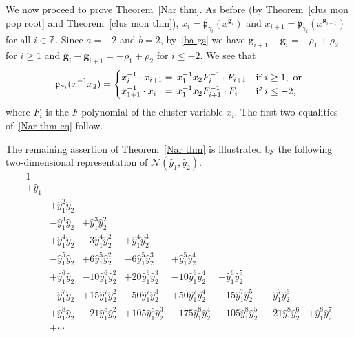 \documentclass[ALCO,ThmDefs,Unicode,epreuves]{cedram}
\newcommand{\integers}{\mathbb Z}
\newcommand{\N}{{\mathcal N}}
\newcommand{\p}{{\mathfrak p}}
\newcommand{\g}{\mathbf{g}}
\newcommand{\hy}{\hat{y}}
\begin{document}
We now proceed to prove Theorem~\ref{Nar thm}.
As before (by Theorem~\ref{clus mon pop root} and Theorem~\ref{clus mon thm}), $x_i=\p_{\gamma_i}(x^{\g_i})$ and $x_{i+1}=\p_{\gamma_i}(x^{\g_{i+1}})$ for all $i\in\integers$.
Since $a=-2$ and $b=2$, by~\eqref{ba gs} we have $\g_{i+1}-\g_i=-\rho_1+\rho_2$ for $i\ge1$ and $\g_i-\g_{i+1}=-\rho_1+\rho_2$ for $i\le-2$.
We see that 
\begin{equation}\label{pi F's}
\p_{\gamma_i}(x_1^{-1}x_2)=\begin{cases}
x_i^{-1}\cdot x_{i+1}=\,x_1^{-1}x_2F_i^{-1}\cdot F_{i+1}&\text{if }i\ge1,\text{ or}\\
x_{1+1}^{-1}\cdot x_i\hspace{6.25pt}=\,x_1^{-1}x_2F_{i+1}^{-1}\cdot F_i&\text{if }i\le-2,
\end{cases}
\end{equation}
where $F_i$ is the $F$-polynomial of the cluster variable $x_i$.
The first two equalities of~\eqref{Nar thm eq} follow.

The remaining assertion of Theorem~\ref{Nar thm} is illustrated by the following two-dimensional representation of $\N(\hy_1,\hy_2)$.
{\small\[\begin{array}{clrrrrrr}
1\\
+\hy_1\\
&+\hy_1^2\hy_2\\
&-\hy_1^3\hy_2&+\hy_1^3\hy_2^2\\\
&+\hy_1^4\hy_2&-3\hy_1^4\hy_2^2&+\hy_1^4\hy_2^3\\\
&-\hy_1^5\hy_2&+6\hy_1^5\hy_2^2&-6\hy_1^5\hy_2^3&+\hy_1^5\hy_2^4\\\
&+\hy_1^6\hy_2&-10\hy_1^6\hy_2^2&+20\hy_1^6\hy_2^3&-10\hy_1^6\hy_2^4&+\hy_1^6\hy_2^5\\\
&-\hy_1^7\hy_2&+15\hy_1^7\hy_2^2&-50\hy_1^7\hy_2^3&+50\hy_1^7\hy_2^4&-15\hy_1^7\hy_2^5&+\hy_1^7\hy_2^6\\\
&+\hy_1^8\hy_2&-21\hy_1^8\hy_2^2&+105\hy_1^8\hy_2^3&-175\hy_1^8\hy_2^4&+105\hy_1^8\hy_2^5&-21\hy_1^8\hy_2^6&+\hy_1^8\hy_2^7
\\
&+\cdots
\end{array}
\]}
\end{document}
